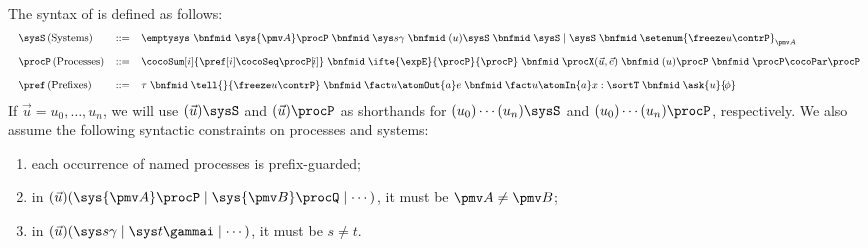 \begin{definition}\label{def:co2:syntax}
	The syntax of \coco is defined as follows:
	\[
	\small
	\begin{array}{r@{\hskip 0.1cm}lclcccccccccccc}   
	& \sysS \, (\text{Systems}) & ::= & 
	\emptysys 
	~\bnfmid ~ \sys {\pmv A} \procP 
	\; \bnfmid \; \sys s \gamma 
	\; \bnfmid \; (u)\sysS
	\; \bnfmid \; \sysS \mid \sysS
	\; \bnfmid \; \setenum{\freeze u \contrP}_{\pmv A}
	\\[.8pc]
	
	& \procP \, (\text{Processes})& ::= &  \textstyle 
	\cocoSum[i]{\pref[i] \cocoSeq \procP[\!i]}
	\; \bnfmid \; \ifte{\expE}{\procP}{\procP}
	\; \bnfmid \; \procX(\vec u,\vec e)
	\; \bnfmid \; (u)\procP
	\; \bnfmid \; \procP \cocoPar \procP
	\\[.8pc]
	
	& \pref \, (\text{Prefixes})& ::= & \tau
	\; \bnfmid \; \tell {} {\freeze u \contrP}
	\; \bnfmid \; \fact u {\atomOut{a} e}
	\; \bnfmid \; \fact u {\atomIn{a} x : \sortT}
	\; \bnfmid \; \ask {u} {\!\phi}
	\end{array}
	\]
	If $\vec u = u_0,\hdots,u_n$,
	we will use $(\vec u) \sysS$ and $(\vec u) \procP$ 
	as shorthands for $(u_0)\cdots(u_n) \sysS$ and $(u_0)\cdots(u_n) \procP$,
	respectively. %
	We also assume the following syntactic constraints on processes and systems:
	\begin{enumerate}
		
		\item each occurrence of named processes is prefix-guarded;
		
		\item in $(\vec u)(\sys {\pmv A} \procP \mid \sys{\pmv B} \procQ \mid \cdots)$,
		it must be $\pmv A \neq \pmv B$;
		
		\item in $(\vec u)(\sys s \gamma \mid \sys t \gammai \mid \cdots)$,
		it must be $s \neq t$.
		
	\end{enumerate}
\end{definition}


